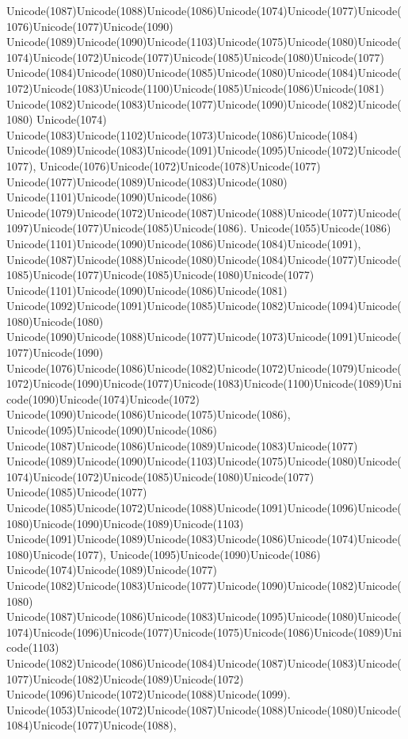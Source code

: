 \documentclass[a4paper,11pt]{report}
\begin{document}
{{{Unicode(1087)Unicode(1088)Unicode(1086)Unicode(1074)Unicode(1077)Unicode(1076)Unicode(1077)Unicode(1090)
Unicode(1089)Unicode(1090)Unicode(1103)Unicode(1075)Unicode(1080)Unicode(1074)Unicode(1072)Unicode(1077)Unicode(1085)Unicode(1080)Unicode(1077)
Unicode(1084)Unicode(1080)Unicode(1085)Unicode(1080)Unicode(1084)Unicode(1072)Unicode(1083)Unicode(1100)Unicode(1085)Unicode(1086)Unicode(1081)
Unicode(1082)Unicode(1083)Unicode(1077)Unicode(1090)Unicode(1082)Unicode(1080)
Unicode(1074)
Unicode(1083)Unicode(1102)Unicode(1073)Unicode(1086)Unicode(1084)
Unicode(1089)Unicode(1083)Unicode(1091)Unicode(1095)Unicode(1072)Unicode(1077),
Unicode(1076)Unicode(1072)Unicode(1078)Unicode(1077)
Unicode(1077)Unicode(1089)Unicode(1083)Unicode(1080)
Unicode(1101)Unicode(1090)Unicode(1086)
Unicode(1079)Unicode(1072)Unicode(1087)Unicode(1088)Unicode(1077)Unicode(1097)Unicode(1077)Unicode(1085)Unicode(1086).
Unicode(1055)Unicode(1086)
Unicode(1101)Unicode(1090)Unicode(1086)Unicode(1084)Unicode(1091),
Unicode(1087)Unicode(1088)Unicode(1080)Unicode(1084)Unicode(1077)Unicode(1085)Unicode(1077)Unicode(1085)Unicode(1080)Unicode(1077)
Unicode(1101)Unicode(1090)Unicode(1086)Unicode(1081)
Unicode(1092)Unicode(1091)Unicode(1085)Unicode(1082)Unicode(1094)Unicode(1080)Unicode(1080)
Unicode(1090)Unicode(1088)Unicode(1077)Unicode(1073)Unicode(1091)Unicode(1077)Unicode(1090)
Unicode(1076)Unicode(1086)Unicode(1082)Unicode(1072)Unicode(1079)Unicode(1072)Unicode(1090)Unicode(1077)Unicode(1083)Unicode(1100)Unicode(1089)Unicode(1090)Unicode(1074)Unicode(1072)
Unicode(1090)Unicode(1086)Unicode(1075)Unicode(1086),
Unicode(1095)Unicode(1090)Unicode(1086)
Unicode(1087)Unicode(1086)Unicode(1089)Unicode(1083)Unicode(1077)
Unicode(1089)Unicode(1090)Unicode(1103)Unicode(1075)Unicode(1080)Unicode(1074)Unicode(1072)Unicode(1085)Unicode(1080)Unicode(1077)
Unicode(1085)Unicode(1077)
Unicode(1085)Unicode(1072)Unicode(1088)Unicode(1091)Unicode(1096)Unicode(1080)Unicode(1090)Unicode(1089)Unicode(1103)
Unicode(1091)Unicode(1089)Unicode(1083)Unicode(1086)Unicode(1074)Unicode(1080)Unicode(1077),
Unicode(1095)Unicode(1090)Unicode(1086)
Unicode(1074)Unicode(1089)Unicode(1077)
Unicode(1082)Unicode(1083)Unicode(1077)Unicode(1090)Unicode(1082)Unicode(1080)
Unicode(1087)Unicode(1086)Unicode(1083)Unicode(1095)Unicode(1080)Unicode(1074)Unicode(1096)Unicode(1077)Unicode(1075)Unicode(1086)Unicode(1089)Unicode(1103)
Unicode(1082)Unicode(1086)Unicode(1084)Unicode(1087)Unicode(1083)Unicode(1077)Unicode(1082)Unicode(1089)Unicode(1072)
Unicode(1096)Unicode(1072)Unicode(1088)Unicode(1099).
Unicode(1053)Unicode(1072)Unicode(1087)Unicode(1088)Unicode(1080)Unicode(1084)Unicode(1077)Unicode(1088),
}}}
\end{document}

